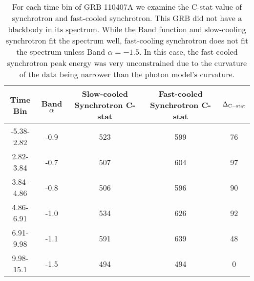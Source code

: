 \begin{table}[h!]
\scriptsize
\centering

\begin{tabular}{c | c | c c | c}



Time Bin & Band $\alpha$ & Slow-cooled Synchrotron C-stat & Fast-cooled Synchrotron C-stat & $\Delta_{\rm C-stat}$ \\ 

\hline \hline



-5.38-2.82 & -0.9 & 523 & 599 & 76 \\ 



2.82-3.84 & -0.7 & 507 & 604 & 97 \\ 



3.84-4.86 & -0.8 & 506 & 596 & 90 \\ 



4.86-6.91 & -1.0 & 534 & 626 & 92 \\ 



6.91-9.98 & -1.1 & 591 & 639 & 48 \\ 



9.98-15.1 & -1.5 & 494 & 494 & 0 \\ 



\end{tabular}

\caption{For each time bin of GRB 110407A we examine the C-stat value of synchrotron and fast-cooled synchrotron. This GRB did not have a blackbody in its spectrum. While the Band function and slow-cooling synchrotron fit the spectrum well, fast-cooling synchrotron does not fit the spectrum unless Band $\alpha=-1.5$. In this case, the fast-cooled synchrotron peak energy was very unconstrained due to the curvature of the data being narrower than the photon model's curvature.}

\label{tab:fast}

\end{table}


